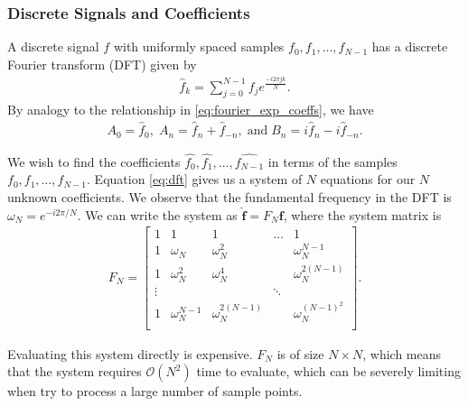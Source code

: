 \documentclass[10pt]{article}
\renewcommand{\vec}{\mathbf}
\begin{document}
\subsubsection{Discrete Signals and Coefficients}
A discrete signal \(f\) with uniformly spaced samples \(f_0, f_1, \dots , f_{N-1}\) has a discrete Fourier transform (DFT) given by \begin{align}\label{eq:dft}
    \hat{f}_k = \sum_{j=0}^{N-1} f_j e^{\frac{-i2\pi jk}{N}}.
\end{align}
 By analogy to the relationship in \eqref{eq:fourier_exp_coeffs}, we have \begin{align*}
    A_0 = \hat{f}_0, \; A_n = \hat{f}_n + \hat{f}_{-n},\;\mathrm{and}\;B_n = i\hat{f}_n - i\hat{f}_{-n}.
 \end{align*}


We wish to find the coefficients \(\hat{f_0}, \hat{f_1}, \dots, \hat{f_{N-1}}\) in terms of the samples \(f_0, f_1, \dots , f_{N-1}\). Equation \eqref{eq:dft} gives us a system of \(N\) equations for our \(N\) unknown coefficients. We observe that the fundamental frequency in the DFT is \(\omega_N = e^{-i2\pi/N}\). We can write the system as \(\hat{\vec{f}} = F_N\vec{f}\), where the system matrix is \begin{align*}
    F_N = \begin{bmatrix}
         1 & 1 & 1& \dots & 1 \\
         1 & \omega_N & \omega_N^2 &  & \omega_N^{N-1} \\
        1 & \omega_N^2 & \omega_N^4 &  & \omega_N^{2(N-1)} \\
         \vdots & & & \ddots \\
         1 & \omega_N^{N-1} & \omega_N^{2(N-1)} &  & \omega_N^{(N-1)^2} \\
     \end{bmatrix}.
\end{align*}

Evaluating this system directly is expensive. \(F_N\) is of size \(N \times N\), which means that the system requires \(\mathcal{O}(N^2)\) time to evaluate, which can be severely limiting when try to process a large number of sample points.


\end{document}
